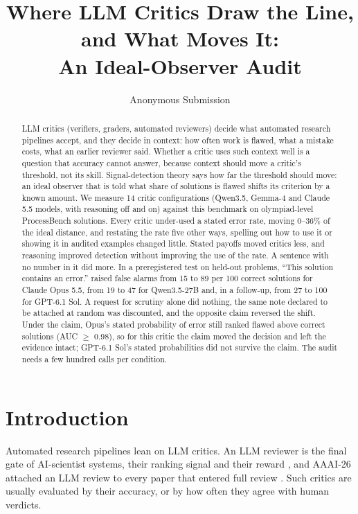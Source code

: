 \documentclass[letterpaper]{article} %
\title{Where LLM Critics Draw the Line, and What Moves It:\\An Ideal-Observer Audit}
\author{Anonymous Submission}
\begin{document}
\maketitle

\begin{abstract}
LLM critics (verifiers, graders, automated reviewers) decide what automated research pipelines accept, and they decide in context: how often work is flawed, what a mistake costs, what an earlier reviewer said. Whether a critic uses such context well is a question that accuracy cannot answer, because context should move a critic's threshold, not its skill. Signal-detection theory says how far the threshold should move: an ideal observer that is told what share of solutions is flawed shifts its criterion by a known amount. We measure 14 critic configurations (Qwen3.5, Gemma-4 and Claude 5.5 models, with reasoning off and on) against this benchmark on olympiad-level ProcessBench solutions. Every critic under-used a stated error rate, moving 0--36\% of the ideal distance, and restating the rate five other ways, spelling out how to use it or showing it in audited examples changed little. Stated payoffs moved critics less, and reasoning improved detection without improving the use of the rate. A sentence with no number in it did more. In a preregistered test on held-out problems, ``This solution contains an error.'' raised false alarms from 15 to 89 per 100 correct solutions for Claude Opus 5.5, from 19 to 47 for Qwen3.5-27B and, in a follow-up, from 27 to 100 for GPT-6.1 Sol. A request for scrutiny alone did nothing, the same note declared to be attached at random was discounted, and the opposite claim reversed the shift. Under the claim, Opus's stated probability of error still ranked flawed above correct solutions (AUC $\geq$ 0.98), so for this critic the claim moved the decision and left the evidence intact; GPT-6.1 Sol's stated probabilities did not survive the claim. The audit needs a few hundred calls per condition.
\end{abstract}

\section{Introduction}

Automated research pipelines lean on LLM critics. An LLM reviewer is the final gate of AI-scientist systems, their ranking signal and their reward \citep{lu2024aiscientist,yamada2025aiscientistv2,weng2025cycleresearcher}, and AAAI-26 attached an LLM review to every paper that entered full review \citep{biswas2026aaai}. Such critics are usually evaluated by their accuracy, or by how often they agree with human verdicts.
\end{document}
